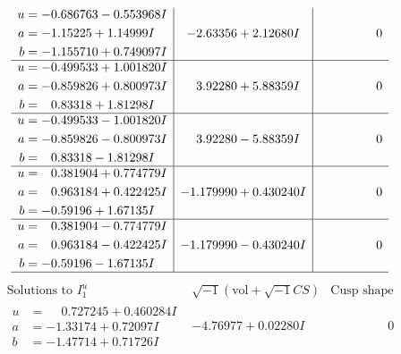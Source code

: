 \documentclass[1p]{elsarticle_modified}
\theoremstyle{definition}
\newcommand{\I}{\sqrt{-1}}
\begin{document}
$$\begin{array}{c|c|c}
\begin{aligned}
u &= -0.686763 - 0.553968 I \\
a &= -1.15225 + 1.14999 I \\
b &= -1.155710 + 0.749097 I\end{aligned}
 & -2.63356 + 2.12680 I & \phantom{-0.000000 } 0 \\ \hline\begin{aligned}
u &= -0.499533 + 1.001820 I \\
a &= -0.859826 + 0.800973 I \\
b &= \phantom{-}0.83318 + 1.81298 I\end{aligned}
 & \phantom{-}3.92280 + 5.88359 I & \phantom{-0.000000 } 0 \\ \hline\begin{aligned}
u &= -0.499533 - 1.001820 I \\
a &= -0.859826 - 0.800973 I \\
b &= \phantom{-}0.83318 - 1.81298 I\end{aligned}
 & \phantom{-}3.92280 - 5.88359 I & \phantom{-0.000000 } 0 \\ \hline\begin{aligned}
u &= \phantom{-}0.381904 + 0.774779 I \\
a &= \phantom{-}0.963184 + 0.422425 I \\
b &= -0.59196 + 1.67135 I\end{aligned}
 & -1.179990 + 0.430240 I & \phantom{-0.000000 } 0 \\ \hline\begin{aligned}
u &= \phantom{-}0.381904 - 0.774779 I \\
a &= \phantom{-}0.963184 - 0.422425 I \\
b &= -0.59196 - 1.67135 I\end{aligned}
 & -1.179990 - 0.430240 I & \phantom{-0.000000 } 0\\
 \hline 
 \end{array}$$\newpage$$\begin{array}{c|c|c}  
\text{Solutions to }I^u_{1}& \I (\text{vol} + \sqrt{-1}CS) & \text{Cusp shape}\\
 \hline 
\begin{aligned}
u &= \phantom{-}0.727245 + 0.460284 I \\
a &= -1.33174 + 0.72097 I \\
b &= -1.47714 + 0.71726 I\end{aligned}
 & -4.76977 + 0.02280 I & \phantom{-0.000000 } 0 \\ \hline\begin{aligned}

\end{aligned}
\end{array}$$
\end{document}
